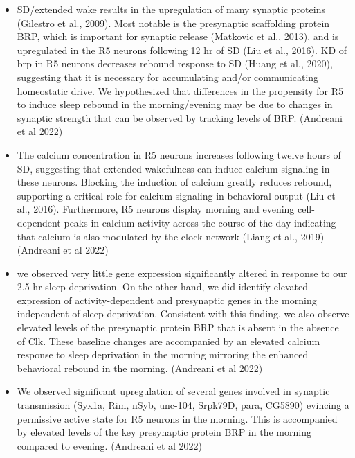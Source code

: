 \documentclass[11pt]{article}
\begin{document}
\begin{itemize}
    \item SD/extended wake results in the upregulation of many synaptic proteins (Gilestro et al., 2009). Most notable is the presynaptic scaffolding protein BRP, which is important for synaptic release (Matkovic et al., 2013), and is upregulated in the R5 neurons following 12 hr of SD (Liu et al., 2016). KD of brp in R5 neurons decreases rebound response to SD (Huang et al., 2020), suggesting that it is necessary for accumulating and/or communicating homeostatic drive. We hypothesized that differences in the propensity for R5 to induce sleep rebound in the morning/evening may be due to changes in synaptic strength that can be observed by tracking levels of BRP.
    \cite{andreaniCircadianProgrammingEllipsoid2022} (Andreani et al 2022)

    \item The calcium concentration in R5 neurons increases following twelve hours of SD, suggesting that extended wakefulness can induce calcium signaling in these neurons. Blocking the induction of calcium greatly reduces rebound, supporting a critical role for calcium signaling in behavioral output (Liu et al., 2016). Furthermore, R5 neurons display morning and evening cell-dependent peaks in calcium activity across the course of the day indicating that calcium is also modulated by the clock network (Liang et al., 2019)
    \cite{andreaniCircadianProgrammingEllipsoid2022} (Andreani et al 2022)

    \item we observed very little gene expression significantly altered in response to our 2.5 hr sleep deprivation. On the other hand, we did identify elevated expression of activity-dependent and presynaptic genes in the morning independent of sleep deprivation. Consistent with this finding, we also observe elevated levels of the presynaptic protein BRP that is absent in the absence of Clk. These baseline changes are accompanied by an elevated calcium response to sleep deprivation in the morning mirroring the enhanced behavioral rebound in the morning.
    \cite{andreaniCircadianProgrammingEllipsoid2022} (Andreani et al 2022)

    \item We observed significant upregulation of several genes involved in synaptic transmission (Syx1a, Rim, nSyb, unc-104, Srpk79D, para, CG5890) evincing a permissive active state for R5 neurons in the morning. This is accompanied by elevated levels of the key presynaptic protein BRP in the morning compared to evening.
    \cite{andreaniCircadianProgrammingEllipsoid2022} (Andreani et al 2022)


\end{itemize}
\end{document}
